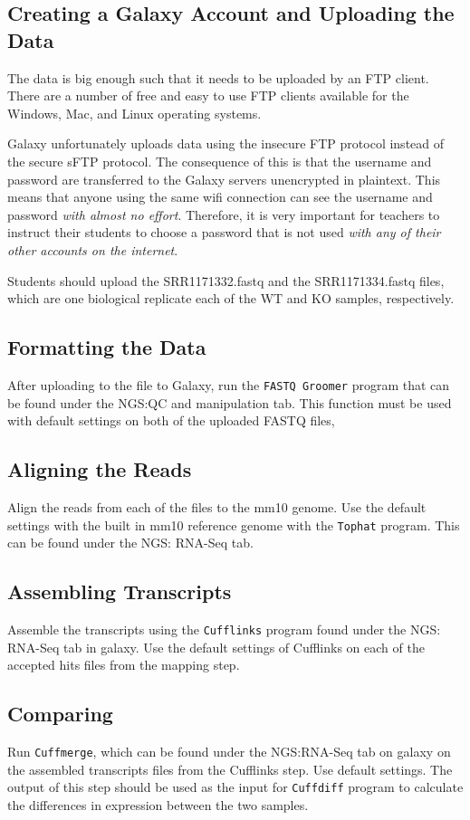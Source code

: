 \documentclass{report}
\begin{document}
\subsection{Creating a Galaxy Account and Uploading the Data}
The data is big enough such that it needs to be uploaded by an FTP client. There are a number of free and easy to use FTP clients available for the Windows, Mac, and Linux operating systems. 

Galaxy unfortunately uploads data using the insecure FTP protocol instead of the secure sFTP protocol. The consequence of this is that the username and password are transferred to the Galaxy servers unencrypted in plaintext. This means that anyone using the same wifi connection can see the username and password \emph{with almost no effort}. Therefore, it is very important for teachers to instruct their students to choose a password that is not used \emph{with any of their other accounts on the internet}. 

Students should upload the SRR1171332.fastq and the SRR1171334.fastq files, which are one biological replicate each of the WT and KO samples, respectively.

\subsection{Formatting the Data}
After uploading to the file to Galaxy, run the \texttt{FASTQ Groomer} program that can be found under the NGS:QC and manipulation tab. This function must be used with default settings on both of the uploaded FASTQ files,  

\subsection{Aligning the Reads}
Align the reads from each of the files to the mm10 genome. Use the default settings with the built in mm10 reference genome with the \texttt{Tophat} program. This can be found under the NGS: RNA-Seq tab.

\subsection{Assembling Transcripts}
Assemble the transcripts using the \texttt{Cufflinks} program found under the NGS: RNA-Seq tab in galaxy. Use the default settings of Cufflinks on each of the accepted hits files from the mapping step.

\subsection{Comparing}
Run \texttt{Cuffmerge}, which can be found under the NGS:RNA-Seq tab on galaxy on the assembled transcripts files from the Cufflinks step. Use default settings. The output of this step should be used as the input for \texttt{Cuffdiff} program to calculate the differences in expression between the two samples. 


\end{document}
